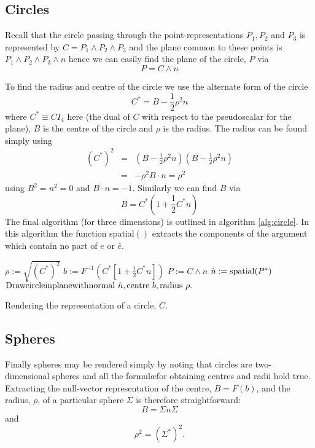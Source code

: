 \subsection{Circles}

Recall that the circle passing through the point-representations $P_1, P_2$ and $P_3$
is represented by $C = P_1 \wedge P_2 \wedge P_3$ and the plane common to these points is
$P_1 \wedge P_2 \wedge P_3 \wedge n$ hence we can easily find the plane of 
the circle, $P$ via
\[
P = C \wedge n
\]

To find the radius and centre of the circle we use the alternate form of the 
circle
\cite{wareham_lasenby}
\[
C^* = B - \frac{1}{2}\rho^2n
\]
where $C^* \equiv CI_4$ here (the dual of $C$ with respect to the pseudoscalar 
for the plane), $B$ is the centre of the circle and $\rho$ is the radius. The
radius can be found simply using
\begin{eqnarray*}
(C^*)^2 & = & \left(B - \frac{1}{2}\rho^2n\right)\left(B - \frac{1}{2}\rho^2n\right) \\
        & = & -\rho^2 B\cdot n = \rho^2
\end{eqnarray*}
using $B^2 = n^2 = 0$ and $B \cdot n = -1$. Similarly we can find $B$ via
\[
B = C^* \left( 1 + \frac{1}{2}C^*n \right)
\]
The final algorithm (for three dimensions) is outlined in algorithm \ref{alg:circle}.
In this algorithm the function spatial$()$ extracts the components of the argument
which contain no part of $e$ or $\bar{e}$.

\begin{fancyalg}
\begin{algorithmic}[1]
\STATE $\rho := \sqrt{(C^*)^2}$
\STATE $b := F^{-1}\left(C^* \left[ 1 + \frac{1}{2}C^*n \right]\right)$
\STATE $P := C \wedge n$
\STATE $\hat{n} := {\rm spatial}(P^*)$
\STATS ${\rm Draw circle in plane with normal~}\hat{n}{\rm, centre~}
b{\rm, radius~}\rho.$
\end{algorithmic}
\caption{\label{alg:circle}Rendering the representation of a circle, $C$.}
\end{fancyalg}

\subsection{Spheres}

Finally spheres may be rendered simply by noting that circles are two-dimensional
spheres and all the formul\ae for obtaining centres and radii hold true. Extracting
the null-vector representation of the centre, $B = F(b)$, and the radius, $\rho$,
of a particular sphere $\Sigma$ is therefore straightforward:
\[
B = \Sigma n \Sigma
\]
and
\[
\rho^2 = \left(\Sigma^*\right)^2.
\]
